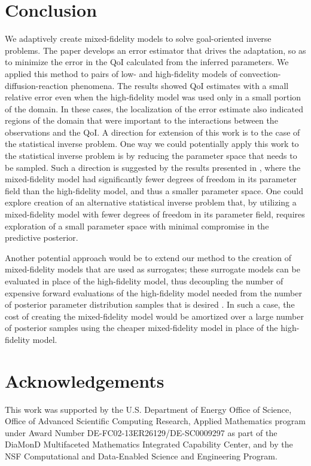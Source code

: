 \documentclass[review,sort&compress]{elsarticle}
\begin{document}
\section{Conclusion}\label{sec:conc}

We adaptively create mixed-fidelity models to solve goal-oriented inverse problems. The paper develops an error estimator that drives the adaptation, so as to minimize the error in the QoI calculated from the inferred parameters. We applied this method to pairs of low- and high-fidelity models of convection-diffusion-reaction phenomena. The results showed QoI estimates with a small relative error even when the high-fidelity model was used only in a small portion of the domain. In these cases, the localization of the error estimate also indicated regions of the domain that were important to the interactions between the observations and the QoI. A direction for extension of this work is to the case of the statistical inverse problem.  One way we could potentially apply this work to the statistical inverse problem is by reducing the parameter space that needs to be sampled. Such a direction is suggested by the results presented in , where the mixed-fidelity model had significantly fewer degrees of freedom in its parameter field than the high-fidelity model, and thus a smaller parameter space. One could explore creation of an alternative statistical inverse problem that, by utilizing a mixed-fidelity model with fewer degrees of freedom in its parameter field, requires exploration of a small parameter space with minimal compromise in the predictive posterior.

Another potential approach would be to extend our method to the creation of mixed-fidelity models that are used as surrogates; these surrogate models can be evaluated in place of the high-fidelity model, thus decoupling the number of expensive forward evaluations of the high-fidelity model needed from the number of posterior parameter distribution samples that is desired \cite{Con14}. In such a case, the cost of creating the mixed-fidelity model would be amortized over a large number of posterior samples using the cheaper mixed-fidelity model in place of the high-fidelity model.

\section*{Acknowledgements}

This work was supported by the U.S. Department of Energy Office of Science, Office of Advanced Scientific
Computing Research, Applied Mathematics program under Award Number DE-FC02-13ER26129/DE-SC0009297 as part of the
DiaMonD Multifaceted Mathematics Integrated Capability Center, and by the NSF Computational and Data-Enabled Science and Engineering Program.
\end{document}

